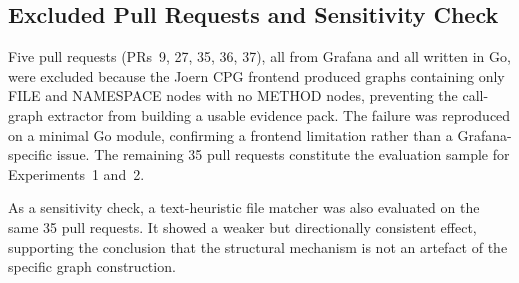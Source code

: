 \subsection{Excluded Pull Requests and Sensitivity Check}
\label{sec:threats-builder-comparability}

Five pull requests (PRs~9, 27, 35, 36, 37), all from Grafana and all written in
Go, were excluded because the Joern CPG frontend produced graphs containing only
FILE and NAMESPACE nodes with no METHOD nodes, preventing the call-graph
extractor from building a usable evidence pack. The failure was reproduced on a
minimal Go module, confirming a frontend limitation rather than a
Grafana-specific issue. The remaining 35 pull requests constitute the evaluation
sample for Experiments~1 and~2.

As a sensitivity check, a text-heuristic file matcher was also evaluated on the
same 35 pull requests. It showed a weaker but directionally consistent effect,
supporting the conclusion that the structural mechanism is not an artefact of the
specific graph construction.

